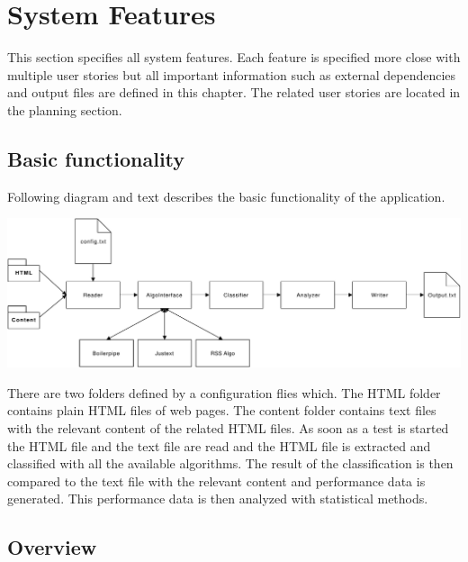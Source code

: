 \section{System Features}

This section specifies all system features. Each feature is specified more close with multiple user stories but all important information such as external dependencies and output files are defined in this chapter. The related user stories are located in the planning section.  



\begin{landscape}

\subsection{Basic functionality}
Following diagram and text describes the basic functionality of the application.

\includegraphics[width=24cm]{Figures/App_overview.pdf}

There are two folders defined by a configuration flies which. The HTML folder contains plain HTML files of web pages. The content folder contains text files with the relevant content of the related HTML files. As soon as a test is started the HTML file and the text file are read and the HTML file is extracted and classified with all the available algorithms. The result of the classification is then compared to the text file with the relevant content and performance data is generated. This performance data is then analyzed with statistical methods. 

\end{landscape}



\subsection{Overview}

